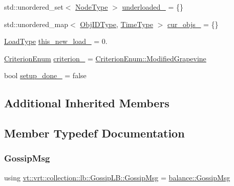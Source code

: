 \begin{DoxyCompactItemize}
\item 
std\+::unordered\+\_\+set$<$ \hyperlink{namespacevt_a866da9d0efc19c0a1ce79e9e492f47e2}{Node\+Type} $>$ \hyperlink{structvt_1_1vrt_1_1collection_1_1lb_1_1_gossip_l_b_a446275a50d83148d702b293bdae89da4}{underloaded\+\_\+} = \{\}
\item 
std\+::unordered\+\_\+map$<$ \hyperlink{structvt_1_1vrt_1_1collection_1_1lb_1_1_base_l_b_a15a2f756b59c8c2437985206b32aa403}{Obj\+I\+D\+Type}, \hyperlink{namespacevt_a876a9d0cd5a952859c72de8a46881442}{Time\+Type} $>$ \hyperlink{structvt_1_1vrt_1_1collection_1_1lb_1_1_gossip_l_b_a77224514e754349db1c297050ec69343}{cur\+\_\+objs\+\_\+} = \{\}
\item 
\hyperlink{structvt_1_1vrt_1_1collection_1_1lb_1_1_base_l_b_a215e22b9f12678303f49615ae3be05cc}{Load\+Type} \hyperlink{structvt_1_1vrt_1_1collection_1_1lb_1_1_gossip_l_b_a0159b2927a9f8874b6eaff32ab2324c7}{this\+\_\+new\+\_\+load\+\_\+} = 0.
\item 
\hyperlink{namespacevt_1_1vrt_1_1collection_1_1lb_a4e454750e102cf5404d5ac151148951c}{Criterion\+Enum} \hyperlink{structvt_1_1vrt_1_1collection_1_1lb_1_1_gossip_l_b_a7174e518d9f439ce8903cacaba9e2a94}{criterion\+\_\+} = \hyperlink{namespacevt_1_1vrt_1_1collection_1_1lb_a4e454750e102cf5404d5ac151148951caf2d66de88187d7c4c75884f5605ae168}{Criterion\+Enum\+::\+Modified\+Grapevine}
\item 
bool \hyperlink{structvt_1_1vrt_1_1collection_1_1lb_1_1_gossip_l_b_a6ef78f0645125746c90fb74cb1afde19}{setup\+\_\+done\+\_\+} = false
\end{DoxyCompactItemize}
\subsection*{Additional Inherited Members}


\subsection{Member Typedef Documentation}
\mbox{\label{structvt_1_1vrt_1_1collection_1_1lb_1_1_gossip_l_b_af7170ae946da8af68105109f04824f03}} 
\subsubsection{\texorpdfstring{Gossip\+Msg}{GossipMsg}}
{\footnotesize\ttfamily using \hyperlink{structvt_1_1vrt_1_1collection_1_1lb_1_1_gossip_l_b_af7170ae946da8af68105109f04824f03}{vt\+::vrt\+::collection\+::lb\+::\+Gossip\+L\+B\+::\+Gossip\+Msg} =  \hyperlink{structvt_1_1vrt_1_1collection_1_1balance_1_1_gossip_msg}{balance\+::\+Gossip\+Msg}}


